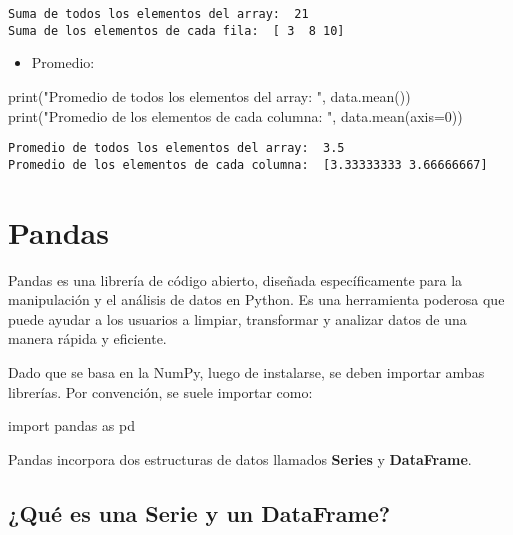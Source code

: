 \documentclass[
  letterpaper,
  DIV=11,
  numbers=noendperiod]{scrreprt}
\newenvironment{Shaded}{\begin{snugshade}}{\end{snugshade}}
\newcommand{\BuiltInTok}[1]{\textcolor[rgb]{0.00,0.23,0.31}{#1}}
\newcommand{\DecValTok}[1]{\textcolor[rgb]{0.68,0.00,0.00}{#1}}
\newcommand{\ImportTok}[1]{\textcolor[rgb]{0.00,0.46,0.62}{#1}}
\newcommand{\NormalTok}[1]{\textcolor[rgb]{0.00,0.23,0.31}{#1}}
\newcommand{\OperatorTok}[1]{\textcolor[rgb]{0.37,0.37,0.37}{#1}}
\newcommand{\StringTok}[1]{\textcolor[rgb]{0.13,0.47,0.30}{#1}}
\providecommand{\tightlist}{%
  \setlength{\itemsep}{0pt}\setlength{\parskip}{0pt}}\usepackage{longtable,booktabs,array}
\begin{document}
\begin{verbatim}
Suma de todos los elementos del array:  21
Suma de los elementos de cada fila:  [ 3  8 10]
\end{verbatim}

\begin{itemize}
\tightlist
\item
  Promedio:
\end{itemize}

\begin{Shaded}
\begin{Highlighting}[]
\BuiltInTok{print}\NormalTok{(}\StringTok{"Promedio de todos los elementos del array: "}\NormalTok{, data.mean())}
\BuiltInTok{print}\NormalTok{(}\StringTok{"Promedio de los elementos de cada columna: "}\NormalTok{, data.mean(axis}\OperatorTok{=}\DecValTok{0}\NormalTok{))}
\end{Highlighting}
\end{Shaded}

\begin{verbatim}
Promedio de todos los elementos del array:  3.5
Promedio de los elementos de cada columna:  [3.33333333 3.66666667]
\end{verbatim}

\section{Pandas}\label{pandas}

Pandas es una librería de código abierto, diseñada específicamente para
la manipulación y el análisis de datos en Python. Es una herramienta
poderosa que puede ayudar a los usuarios a limpiar, transformar y
analizar datos de una manera rápida y eficiente.

Dado que se basa en la NumPy, luego de instalarse, se deben importar
ambas librerías. Por convención, se suele importar como:

\begin{Shaded}
\begin{Highlighting}[]
\ImportTok{import}\NormalTok{ pandas }\ImportTok{as}\NormalTok{ pd}
\end{Highlighting}
\end{Shaded}

Pandas incorpora dos estructuras de datos llamados \textbf{Series} y
\textbf{DataFrame}.

\subsection{\texorpdfstring{¿Qué es una \textbf{Serie} y un
\textbf{DataFrame}?}{¿Qué es una Serie y un DataFrame?}}\label{quuxe9-es-una-serie-y-un-dataframe}
\end{document}

